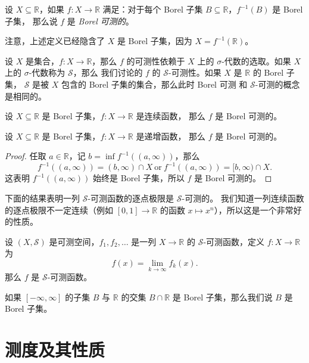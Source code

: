 \documentclass[fontset=none]{Notes}
\begin{document}
\begin{definition}
  设 $X\subseteq \mathbb{R}$，如果 $f:X\to \mathbb{R}$ 满足：对于每个
  Borel 子集 $B\subseteq \mathbb{R}$，$f^{-1}(B)$ 是 Borel 子集，
  那么说 $f$ 是 \emph{Borel 可测的}。
\end{definition}

注意，上述定义已经隐含了 $X$ 是 Borel 子集，因为 $X=f^{-1}(\mathbb{R})$。

设 $X$ 是集合，$f:X\to \mathbb{R}$，那么 $f$ 的可测性依赖于 $X$ 上的
$\sigma$-代数的选取。如果 $X$ 上的 $\sigma$-代数称为 $\mathcal{S}$，那么
我们讨论的 $f$ 的 $\mathcal{S}$-可测性。如果 $X$ 是 $\mathbb{R}$ 的 Borel 子集，
$\mathcal{S}$ 是被 $X$ 包含的 Borel 子集的集合，那么此时 Borel 可测
和 $\mathcal{S}$-可测的概念是相同的。

\begin{theorem}
  设 $X\subseteq \mathbb{R}$ 是 Borel 子集，$f:X\to \mathbb{R}$ 是连续函数，
  那么 $f$ 是 Borel 可测的。 
\end{theorem}

\begin{theorem}
  设 $X\subseteq \mathbb{R}$ 是 Borel 子集，$f:X\to \mathbb{R}$ 是递增函数，
  那么 $f$ 是 Borel 可测的。 
\end{theorem}
\begin{proof}
  任取 $a\in \mathbb{R}$，记 $b=\inf f^{-1}((a,\infty))$，那么
  \[
    f^{-1}((a,\infty))=(b,\infty)\cap X\ \text{or} \ 
    f^{-1}((a,\infty))=[b,\infty)\cap X.
  \]
  这表明 $f^{-1}((a,\infty))$ 始终是 Borel 子集，所以 $f$ 是
  Borel 可测的。
\end{proof}

下面的结果表明一列 $\mathcal{S}$-可测函数的逐点极限是 $\mathcal{S}$-可测的。
我们知道一列连续函数的逐点极限不一定连续（例如 $[0,1]\to \mathbb{R}$ 的函数 $x\mapsto x^n$），所以这是一个非常好的性质。

\begin{theorem}
  设 $(X,\mathcal{S})$ 是可测空间，$f_1,f_2,\dots$ 是一列 $X\to \mathbb{R}$
  的 $\mathcal{S}$-可测函数，定义 $f:X\to \mathbb{R}$ 为
  \[
    f(x)=\lim_{k\to \infty} f_k(x).
  \]
  那么 $f$ 是 $\mathcal{S}$-可测函数。
\end{theorem}

\begin{definition}
  如果 $[-\infty,\infty]$ 的子集 $B$ 与 $\mathbb{R}$ 的交集 $B\cap \mathbb{R}$
  是 Borel 子集，那么我们说 $B$ 是 Borel 子集。
\end{definition}

\section{测度及其性质}
\end{document}
